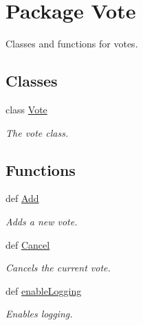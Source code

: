 \hypertarget{namespace_vote}{
\section{Package Vote}
\label{namespace_vote}
}


Classes and functions for votes.  


\subsection*{Classes}
\begin{DoxyCompactItemize}
\item 
class \hyperlink{class_vote_1_1_vote}{Vote}
\begin{DoxyCompactList}\small\item\em The vote class. \item\end{DoxyCompactList}\end{DoxyCompactItemize}
\subsection*{Functions}
\begin{DoxyCompactItemize}
\item 
def \hyperlink{namespace_vote_a9c7157cc8fb02e15e7103b7cdf58d3d5}{Add}
\begin{DoxyCompactList}\small\item\em Adds a new vote. \item\end{DoxyCompactList}\item 
def \hyperlink{namespace_vote_a5d75127361161b29f9a36a7f8d3cc1ed}{Cancel}
\begin{DoxyCompactList}\small\item\em Cancels the current vote. \item\end{DoxyCompactList}\item 
def \hyperlink{namespace_vote_acfb2109b9dab2995578ab19517868aa3}{enableLogging}
\begin{DoxyCompactList}\small\item\em Enables logging. \item\end{DoxyCompactList}\end{DoxyCompactItemize}

